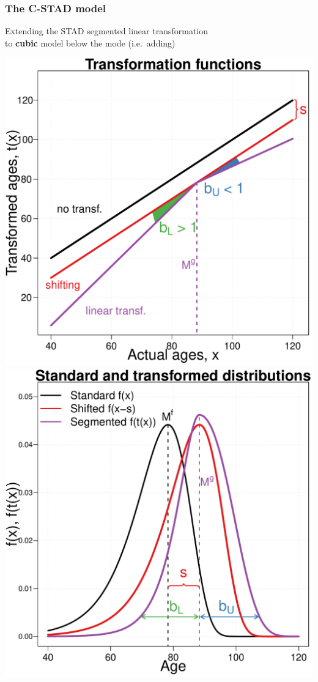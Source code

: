 \documentclass[12pt, xcolor=table]{beamer}  %
\begin{document}
\begin{frame}\frametitle{The C-STAD model}
	
	\begin{center}	
		Extending the STAD segmented linear transformation \\ {\color{white} to \textbf{cubic} model below the mode (i.e.~adding)}
		
		\vspace{0.25cm}
		
		\includegraphics[scale=.32]{Figures/Ch4/F2_Model_ShiftComp}\includegraphics[scale=.32]{Figures/Ch4/F2_Dens_ShiftComp}
		
	\end{center}
	
\end{frame}
\end{document}
